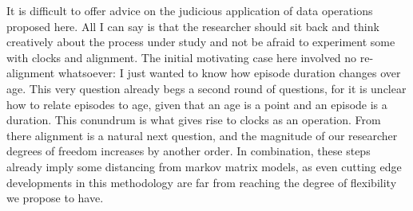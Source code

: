 \documentclass{article}
\begin{document}
It is difficult to offer advice on the judicious application of data
operations proposed here. All I can say is that the researcher should sit back
and think creatively about the process under study and not be afraid to
experiment some with clocks and alignment. The initial motivating case here
involved no re-alignment whatsoever: I just wanted to know how episode duration
changes over age. This very question already begs a second round of questions,
for it is unclear how to relate episodes to age, given that an age is a point
and an episode is a duration. This conundrum is what gives rise to clocks as an
operation. From there alignment is a natural next question, and the magnitude of
our researcher degrees of freedom increases by another order. In combination,
these steps already imply some distancing from markov matrix models, as even
cutting edge developments in this methodology are far from reaching the degree
of flexibility we propose to have.

\FloatBarrier
\singlespacing

   
\end{document}
